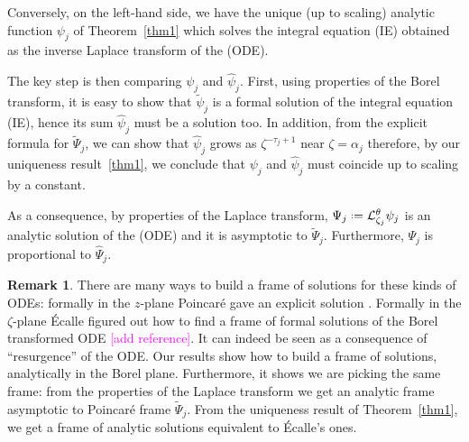 \documentclass{article}
\theoremstyle{definition}
\newcommand{\series}[1]{\tilde{#1}}
\newcommand*{\defeq}{\mathrel{\vcenter{\baselineskip0.5ex \lineskiplimit0pt
                     \hbox{\scriptsize.}\hbox{\scriptsize.}}}%
                     =}
\newcommand{\laplace}{\mathcal{L}}
\newcommand{\borel}{\mathcal{B}}
\newtheorem{remark}[definition]{Remark}
\begin{document}
\begin{center}
\end{center} 

Conversely, on the left-hand side, we have the unique (up to scaling) analytic function $\psi_j$ of Theorem~\ref{thm1} which solves the integral equation (IE) obtained as the inverse Laplace transform of the (ODE).   

The key step is then comparing $\psi_j$ and $\hat{\psi}_j$. First, using properties of the Borel transform, it is easy to show that $\series{\psi}_j$ is a formal solution of the integral equation (IE), hence its sum $\hat{\psi}_j$ must be a solution too. In addition, from the explicit formula for $\tilde{\Psi}_j$, we can show that $\hat{\psi}_j$ grows as $\zeta^{-\tau_j+1}$ near $\zeta=\alpha_j$
therefore, by our uniqueness result~\ref{thm1}, we conclude that $\psi_j$ and $\hat{\psi}_j$ must coincide up to scaling by a constant. 

As a consequence, by properties of the Laplace transform, $\Psi_j\defeq\laplace_{\zeta_j}^{\theta}\psi_j$ is an analytic solution of the (ODE) and it is asymptotic to $\series{\Psi}_j$. Furthermore, $\Psi_j$ is proportional to $\hat{\Psi}_j$.   

\begin{remark}
There are many ways to build a frame of solutions for these kinds of ODEs: formally in the $z$-plane Poincar\'e gave an explicit solution \cite{int-irreg}. Formally in the $\zeta$-plane \'Ecalle figured out how to find a frame of formal solutions of the Borel transformed ODE \textcolor{magenta}{[add reference]\cite{EcalleIII,loday-Remy2011}}. It can indeed be seen as a consequence of ``resurgence'' of the ODE. Our results show how to build a frame of solutions, analytically in the Borel plane. Furthermore, it shows we are picking the same frame: from the properties of the Laplace transform we get an analytic frame asymptotic to Poincar\'e frame $\series{\Psi}_j$. From the uniqueness result of Theorem~\ref{thm1}, we get a frame of analytic solutions equivalent to \'Ecalle's ones. 
\end{remark} 
\end{document}
